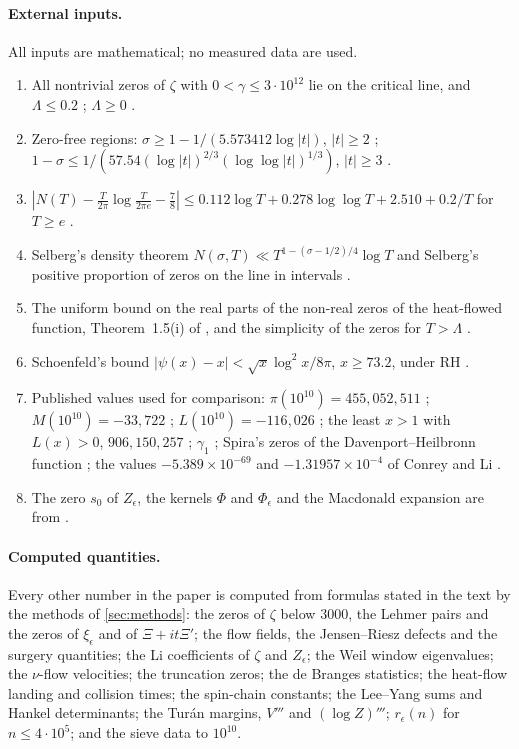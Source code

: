 \documentclass[11pt]{article}
\theoremstyle{definition}\newtheorem{definition}[theorem]{Definition}
\theoremstyle{remark}\newtheorem{remark}[theorem]{Remark}
\begin{document}
\paragraph{External inputs.} All inputs are mathematical; no measured data are used.
\begin{enumerate}[label=(\roman*)]
\item All nontrivial zeros of $\zeta$ with $0<\gamma\le3\cdot10^{12}$ lie on the critical line, and $\Lambda\le0.2$ \cite{PT}; $\Lambda\ge0$ \cite{RT}.
\item Zero-free regions: $\sigma\ge1-1/(5.573412\log|t|)$, $|t|\ge2$ \cite{MT}; $1-\sigma\le1/(57.54(\log|t|)^{2/3}(\log\log|t|)^{1/3})$, $|t|\ge3$ \cite[Thm.~5]{Ford}.
\item $|N(T)-\frac T{2\pi}\log\frac T{2\pi e}-\frac78|\le0.112\log T+0.278\log\log T+2.510+0.2/T$ for $T\ge e$ \cite{Trudgian}.
\item Selberg's density theorem $N(\sigma,T)\ll T^{1-(\sigma-1/2)/4}\log T$ \cite{Selberg46} and Selberg's positive proportion of zeros on the line in intervals \cite[Ch.~X]{Titchmarsh}.
\item The uniform bound on the real parts of the non-real zeros of the heat-flowed function, Theorem~1.5(i) of \cite{Polymath}, and the simplicity of the zeros for $T>\Lambda$ \cite[Cor.~1]{CSV}.
\item Schoenfeld's bound $|\psi(x)-x|<\sqrt x\log^2x/8\pi$, $x\ge73.2$, under RH \cite{Schoenfeld}.
\item Published values used for comparison: $\pi(10^{10})=455{,}052{,}511$ \cite{OEISpi}; $M(10^{10})=-33{,}722$ \cite{OEISM}; $L(10^{10})=-116{,}026$ \cite{OEISL}; the least $x>1$ with $L(x)>0$, $906{,}150{,}257$ \cite{Tanaka}; $\gamma_1$ \cite{Odlyzko}; Spira's zeros of the Davenport--Heilbronn function \cite{Spira}; the values $-5.389\times10^{-69}$ and $-1.31957\times10^{-4}$ of Conrey and Li \cite{CL}.
\item The zero $s_0$ of $Z_\epsilon$, the kernels $\Phi$ and $\Phi_\epsilon$ and the Macdonald expansion are from \cite{S01}.
\end{enumerate}
\paragraph{Computed quantities.} Every other number in the paper is computed from formulas stated in the text by the methods of \cref{sec:methods}: the zeros of $\zeta$ below $3000$, the Lehmer pairs and the zeros of $\xi_\epsilon$ and of $\Xi+it\Xi'$; the flow fields, the Jensen--Riesz defects and the surgery quantities; the Li coefficients of $\zeta$ and $Z_\epsilon$; the Weil window eigenvalues; the $\nu$-flow velocities; the truncation zeros; the de Branges statistics; the heat-flow landing and collision times; the spin-chain constants; the Lee--Yang sums and Hankel determinants; the Tur\'an margins, $V'''$ and $(\log Z)'''$; $r_\epsilon(n)$ for $n\le4\cdot10^5$; and the sieve data to $10^{10}$.
\end{document}
